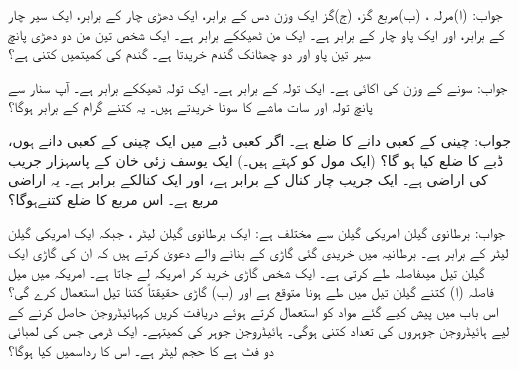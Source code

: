 جواب: (ا)مرلہ ، (ب)مربع گز، (ج)گز
ایک   وزن دس  کے برابر، ایک دھڑی  چار  کے برابر، ایک سیر چار  کے برابر،  اور ایک پاو  چار  کے برابر ہے۔ ایک من ٹھیککے برابر ہے۔ ایک شخص تین من دو دھڑی پانچ سیر تین پاو  اور دو چھٹانک  گندم   خریدتا ہے۔ گندم کی کمیتمیں کتنی  ہے؟ 

جواب: 
سونے کے وزن کی اکائی  ہے۔ ایک تولہ  کے برابر ہے۔ ایک تولہ ٹھیککے برابر ہے۔ آپ سنار سے پانچ تولہ اور سات ماشے کا سونا خریدتے ہیں۔ یہ کتنے گرام کے برابر ہوگا؟ 

جواب:  
چینی کے  کعبی  دانے کا ضلع ہے۔ اگر   کعبی ڈبے میں ایک  چینی کے کعبی دانے  ہوں،  ڈبے   کا ضلع کیا ہو گا؟ (ایک مول   کو کہتے ہیں۔) 
ایک یوسف زئی خان کے پاسہزار جریب کی اراضی ہے۔ ایک جریب چار کنال کے برابر ہے، اور ایک کنالکے برابر ہے۔ یہ اراضی  مربع ہے۔ اس مربع کا ضلع کتنےہوگا؟ 

جواب: 
برطانوی  گیلن امریکی  گیلن سے مختلف ہے: ایک برطانوی  گیلن  لیٹر ، جبکہ ایک امریکی   
گیلن  لیٹر کے برابر ہے۔ برطانیہ میں خریدی گئی  گاڑی  کے بنانے والے دعویٰ کرتے ہیں کہ  ان کی گاڑی  ایک گیلن
 تیل  میںفاصلہ طے کرتی ہے۔ ایک شخص  گاڑی خرید کر امریکہ لے جاتا ہے۔ امریکہ میں  میل فاصلہ  (ا) کتنے گیلن تیل میں طے ہونا متوقع ہے اور  (ب) گاڑی حقیقتاً کتنا تیل استعمال کرے گی؟ 
اس باب میں پیش کیے گئے مواد کو استعمال کرتے ہوئے دریافت کریں کہہائیڈروجن حاصل کرنے کے لیے ہائیڈروجن جوہروں کی تعداد کتنی ہوگی۔  ہائیڈروجن جوہر کی کمیتہے۔ 
ایک ڈرمی جس کی لمبائی دو   فٹ ہے کا حجم لیٹر ہے۔ اس کا رداسمیں کیا  ہوگا؟ 

